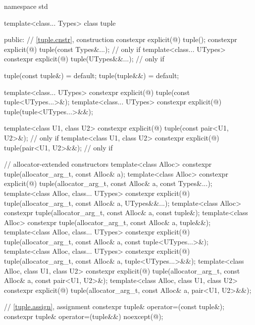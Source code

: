 \begin{codeblock}
namespace std {
  template<class... Types>
  class tuple {
  public:
    // \ref{tuple.cnstr},  construction
    constexpr explicit(@\seebelow@) tuple();
    constexpr explicit(@\seebelow@) tuple(const Types&...);         // only if 
    template<class... UTypes>
      constexpr explicit(@\seebelow@) tuple(UTypes&&...);           // only if 

    tuple(const tuple&) = default;
    tuple(tuple&&) = default;

    template<class... UTypes>
      constexpr explicit(@\seebelow@) tuple(const tuple<UTypes...>&);
    template<class... UTypes>
      constexpr explicit(@\seebelow@) tuple(tuple<UTypes...>&&);

    template<class U1, class U2>
      constexpr explicit(@\seebelow@) tuple(const pair<U1, U2>&);   // only if 
    template<class U1, class U2>
      constexpr explicit(@\seebelow@) tuple(pair<U1, U2>&&);        // only if 

    // allocator-extended constructors
    template<class Alloc>
      constexpr tuple(allocator_arg_t, const Alloc& a);
    template<class Alloc>
      constexpr explicit(@\seebelow@)
        tuple(allocator_arg_t, const Alloc& a, const Types&...);
    template<class Alloc, class... UTypes>
      constexpr explicit(@\seebelow@)
        tuple(allocator_arg_t, const Alloc& a, UTypes&&...);
    template<class Alloc>
      constexpr tuple(allocator_arg_t, const Alloc& a, const tuple&);
    template<class Alloc>
      constexpr tuple(allocator_arg_t, const Alloc& a, tuple&&);
    template<class Alloc, class... UTypes>
      constexpr explicit(@\seebelow@)
        tuple(allocator_arg_t, const Alloc& a, const tuple<UTypes...>&);
    template<class Alloc, class... UTypes>
      constexpr explicit(@\seebelow@)
        tuple(allocator_arg_t, const Alloc& a, tuple<UTypes...>&&);
    template<class Alloc, class U1, class U2>
      constexpr explicit(@\seebelow@)
        tuple(allocator_arg_t, const Alloc& a, const pair<U1, U2>&);
    template<class Alloc, class U1, class U2>
      constexpr explicit(@\seebelow@)
        tuple(allocator_arg_t, const Alloc& a, pair<U1, U2>&&);

    // \ref{tuple.assign},  assignment
    constexpr tuple& operator=(const tuple&);
    constexpr tuple& operator=(tuple&&) noexcept(@\seebelow@);

}}
\end{codeblock}
